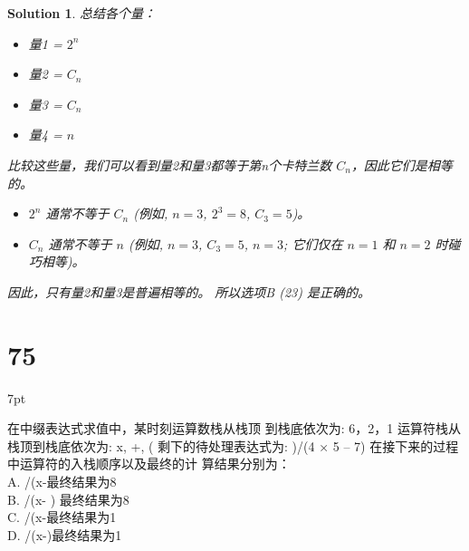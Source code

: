 \documentclass[UTF8]{report}
\newtheorem{solution}{Solution}
\theoremstyle{MyLineTheoremStyle} %
\theoremstyle{MyBlockTheoremStyle} %
\theoremstyle{MySubsubsectionStyle} %
\newenvironment{graybox}{%
        \def\FrameCommand{%
        \hspace{1pt}%
        {\color{gray}\small \vrule width 2pt}%
        {\color{graybox_color}\vrule width 4pt}%
        \colorbox{graybox_color}%
        }%
        \MakeFramed{\advance\hsize-\width\FrameRestore}%
        \noindent\hspace{-4.55pt}%
        \begin{adjustwidth}{}{7pt}%
        \vspace{2pt}\vspace{2pt}%
        }
        {%
        \vspace{2pt}\end{adjustwidth}\endMakeFramed%
        }
\begin{document}
\begin{solution}
总结各个量：
\begin{itemize}
    \item 量1 = $2^n$
    \item 量2 = $C_n$
    \item 量3 = $C_n$
    \item 量4 = $n$
\end{itemize}

比较这些量，我们可以看到量2和量3都等于第n个卡特兰数 $C_n$，因此它们是相等的。

\begin{itemize}
    \item $2^n$ 通常不等于 $C_n$ (例如, $n=3$, $2^3=8$, $C_3=5$)。
    \item $C_n$ 通常不等于 $n$ (例如, $n=3$, $C_3=5$, $n=3$; 它们仅在 $n=1$ 和 $n=2$ 时碰巧相等)。
\end{itemize}

因此，只有量2和量3是普遍相等的。
所以选项B (23) 是正确的。
\end{solution}




\section*{75}
\begin{graybox}
在中缀表达式求值中，某时刻运算数栈从栈顶
到栈底依次为:
6，2，1
运算符栈从栈顶到栈底依次为:
x, +, (
剩下的待处理表达式为:
)/(4 × 5 – 7)
在接下来的过程中运算符的入栈顺序以及最终的计
算结果分别为：\\
A. /(x-最终结果为8 \\
B. /(x- ) 最终结果为8 \\
C. /(x-最终结果为1 \\
D. /(x-)最终结果为1
\end{graybox}
\end{document}
